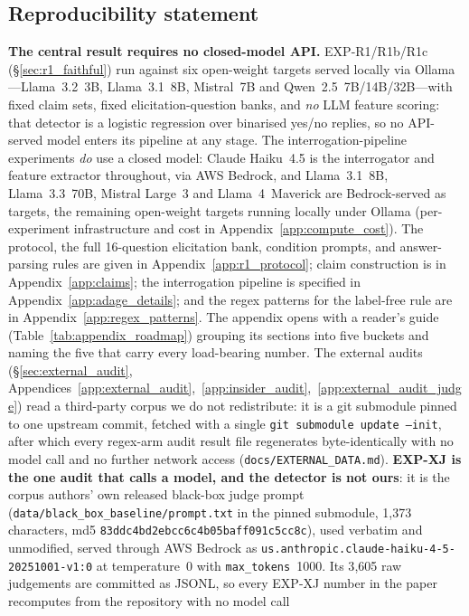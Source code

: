 \documentclass{article} %
\begin{document}
\subsection*{Reproducibility statement}
\textbf{The central result requires no closed-model API.} EXP-R1/R1b/R1c
(§\ref{sec:r1_faithful}) run against six open-weight targets served locally via
Ollama---Llama~3.2~3B, Llama~3.1~8B, Mistral~7B and Qwen~2.5~7B/14B/32B---with
fixed claim sets, fixed elicitation-question banks, and \emph{no} LLM feature
scoring: that detector is a logistic regression over binarised yes/no replies,
so no API-served model enters its pipeline at any stage.
The interrogation-pipeline experiments \emph{do} use a closed model: Claude
Haiku~4.5 is the interrogator and feature extractor throughout, via AWS
Bedrock, and Llama~3.1~8B, Llama~3.3~70B, Mistral Large~3 and Llama~4~Maverick
are Bedrock-served as targets, the remaining open-weight targets running locally
under Ollama (per-experiment infrastructure and cost in
Appendix~\ref{app:compute_cost}).
The protocol, the full 16-question elicitation bank, condition prompts, and
answer-parsing rules are given in Appendix~\ref{app:r1_protocol}; claim
construction is in Appendix~\ref{app:claims}; the interrogation pipeline is
specified in Appendix~\ref{app:adage_details}; and the regex patterns for the
label-free rule are in Appendix~\ref{app:regex_patterns}. The appendix opens with a
reader's guide (Table~\ref{tab:appendix_roadmap}) grouping its sections into five
buckets and naming the five that carry every load-bearing number. The external audits (§\ref{sec:external_audit},
Appendices~\ref{app:external_audit},~\ref{app:insider_audit},~\ref{app:external_audit_judge})
read a third-party corpus we do not redistribute: it is a git submodule pinned to
one upstream commit, fetched with a single \texttt{git submodule update --init},
after which every regex-arm audit result file regenerates byte-identically with no
model call and no further network access (\texttt{docs/EXTERNAL\_DATA.md}).
\textbf{EXP-XJ is the one audit that calls a model, and the detector is not ours}:
it is the corpus authors' own released black-box judge prompt
(\texttt{data/black\_box\_baseline/prompt.txt} in the pinned submodule, 1{,}373
characters, md5 \texttt{83ddc4bd2ebcc6c4b05baff091c5cc8c}), used verbatim and
unmodified, served through AWS Bedrock as
\texttt{us.anthropic.claude-haiku-4-5-20251001-v1:0} at temperature~0 with
\texttt{max\_tokens}~1000. Its 3{,}605 raw judgements are committed as JSONL, so
every EXP-XJ number in the paper recomputes from the repository with no model call
\end{document}
